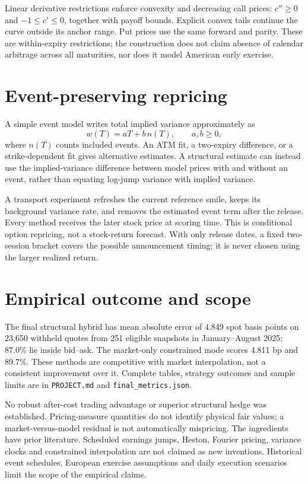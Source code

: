\documentclass[11pt]{article}
\begin{document}
Linear derivative restrictions enforce convexity and decreasing call prices:
$c''\ge0$ and $-1\le c'\le0$, together with payoff bounds. Explicit convex tails
continue the curve outside its anchor range. Put prices use the same forward
and parity. These are within-expiry restrictions; the construction does not
claim absence of calendar arbitrage across all maturities, nor does it model
American early exercise.

\section{Event-preserving repricing}
A simple event model writes total implied variance approximately as
\[
 w(T)=aT+b\,n(T),\qquad a,b\ge0,
\]
where $n(T)$ counts included events. An ATM fit, a two-expiry difference, or a
strike-dependent fit gives alternative estimates. A structural estimate can
instead use the implied-variance difference between model prices with and
without an event, rather than equating log-jump variance with implied variance.

A transport experiment refreshes the current reference smile, keeps its
background variance rate, and removes the estimated event term after the
release. Every method receives the later stock price at scoring time. This is
conditional option repricing, not a stock-return forecast. With only release
dates, a fixed two-session bracket covers the possible announcement timing;
it is never chosen using the larger realized return.

\section{Empirical outcome and scope}
The final structural hybrid has mean absolute error of 4.849 spot basis points
on 23,650 withheld quotes from 251 eligible snapshots in January--August 2025;
87.0\% lie inside bid--ask. The market-only constrained mode scores 4.811 bp and
89.7\%. These methods are competitive with market interpolation, not a
consistent improvement over it. Complete tables, strategy outcomes and sample
limits are in \texttt{PROJECT.md} and \texttt{final\_metrics.json}.

No robust after-cost trading advantage or superior structural hedge was
established. Pricing-measure quantities do not identify physical fair values;
a market-versus-model residual is not automatically mispricing. The ingredients
have prior literature. Scheduled earnings jumps, Heston, Fourier pricing,
variance clocks and constrained interpolation are not claimed as new inventions.
Historical event schedules, European exercise assumptions and daily execution
scenarios limit the scope of the empirical claims.
\end{document}
